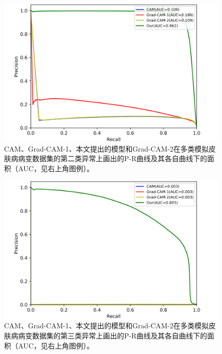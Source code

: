 \begin{figure}[H]
	\centering
	\includegraphics[width=1.0\textwidth]{figure/pr_curve_multi_skin/SKIN_pr_curve.png}
	\caption{CAM、Grad-CAM-1、本文提出的模型和Grad-CAM-2在多类模拟皮肤病病变数据集的第二类异常上画出的P-R曲线及其各自曲线下的面积（AUC，见右上角图例）。} 
	\label{fig:multi_simulate_pr_curve_skin}
\end{figure}
\vspace{-0.8cm}
\begin{figure}[H]
	\centering
	\includegraphics[width=1.0\textwidth]{figure/pr_curve_multi_skin/CIRCLE_pr_curve.png}
	\caption{CAM、Grad-CAM-1、本文提出的模型和Grad-CAM-2在多类模拟皮肤病病变数据集的第三类异常上画出的P-R曲线及其各自曲线下的面积（AUC，见右上角图例）。} 
	\label{fig:multi_simulate_pr_curve_circle}
\end{figure}


